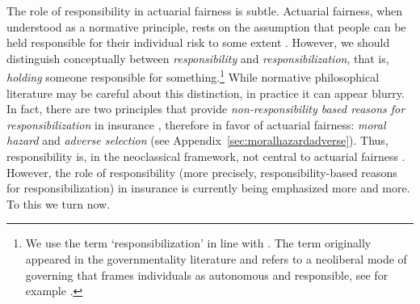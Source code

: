 \documentclass[11pt]{article} %
\begin{document}
The role of responsibility in actuarial fairness is subtle. Actuarial fairness, when understood as a normative principle, rests on the assumption that people can be held responsible for their individual risk to some extent \citep{lehtonen2015producing}. However, we should distinguish conceptually between \textit{responsibility} and \textit{responsibilization}, that is, \textit{holding} someone responsible for something.\footnote{We use the term `responsibilization' in line with \citet{andersen2015luck}. The term originally appeared in the governmentality literature and refers to a neoliberal mode of governing that frames individuals as autonomous and responsible, see for example \citep{shamir2008age,pyysiainen2017neoliberal}.} While normative philosophical literature may be careful about this distinction, in practice it can appear blurry. In fact, there are two principles that provide \textit{non-responsibility based reasons for responsibilization}  in insurance \citep{andersen2015luck}, therefore in favor of actuarial fairness: \textit{moral hazard} and \textit{adverse selection} (see Appendix~\ref{sec:moralhazardadverse}).
Thus, responsibility is, in the neoclassical framework, not central to actuarial fairness \citep{landes2015fair}.
However, the role of responsibility (more precisely, responsibility-based reasons for responsibilization) in insurance is currently being emphasized more and more. To this we turn now.
\end{document}
